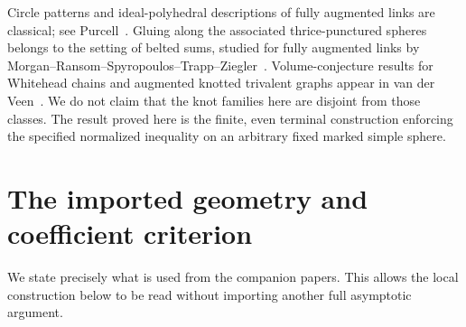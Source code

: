 \documentclass[11pt]{article}
\numberwithin{equation}{section}
\theoremstyle{definition}
\begin{document}
Circle patterns and ideal-polyhedral descriptions of fully augmented
links are classical; see Purcell~\cite{Purcell}. Gluing along the
associated thrice-punctured spheres belongs to the setting of
belted sums, studied for fully augmented links by
Morgan--Ransom--Spyropoulos--Trapp--Ziegler~\cite{Belted}.
Volume-conjecture results for Whitehead chains and augmented knotted
trivalent graphs appear in van der Veen~\cite{Whitehead,Trivalent}.
We do not claim that the knot families here are disjoint from those
classes. The result proved here is the finite, even terminal
construction enforcing the specified normalized inequality on
an arbitrary fixed marked simple sphere.

\section{The imported geometry and coefficient criterion}

We state precisely what is used from the companion papers. This
allows the local construction below to be read without importing
another full asymptotic argument.
\end{document}
